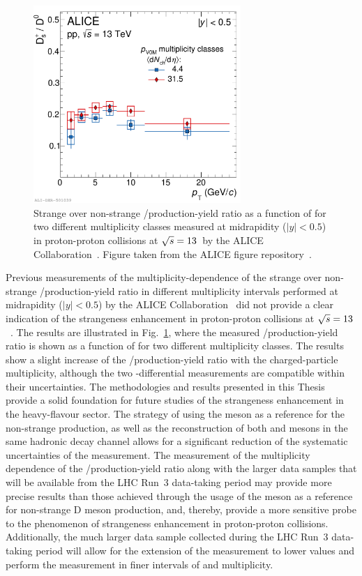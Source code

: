 \begin{figure}[tb]
    \centering
    \includegraphics[width=0.7\textwidth]{Figures/Chapter 9/DsD0Ratios_LowHighMult_V0M_Derived.pdf}
    \caption{Strange over non-strange \ds/\dz production-yield ratio as a function of \pt for two different multiplicity classes measured at midrapidity ($\lvert y\rvert<0.5$) in proton-proton collisions at $\sqrt{s}=13$~\tev by the ALICE Collaboration~\cite{ALICE:2021npz}. Figure taken from the ALICE figure repository~\cite{ALICE_figures}.}
    \label{fig:ALICE_DsD0VsMultiplicity}
\end{figure}

Previous measurements of the multiplicity-dependence of the strange over non-strange \ds/\dz production-yield ratio in different multiplicity intervals performed at midrapidity ($\lvert y\rvert<0.5$) by the ALICE Collaboration~\cite{ALICE:2021npz} did not provide a clear indication of the strangeness enhancement in proton-proton collisions at $\sqrt{s}=13$~\tev. The results are illustrated in Fig.~\ref{fig:ALICE_DsD0VsMultiplicity}, where the measured \ds/\dz production-yield ratio is shown as a function of \pt for two different multiplicity classes. The results show a slight increase of the \ds/\dz production-yield ratio with the charged-particle multiplicity, although the two \pt-differential measurements are compatible within their uncertainties. The methodologies and results presented in this Thesis provide a solid foundation for future studies of the strangeness enhancement in the heavy-flavour sector. The strategy of using the \dpl meson as a reference for the non-strange production, as well as the reconstruction of both \ds and \dpl mesons in the same hadronic decay channel allows for a significant reduction of the systematic uncertainties of the measurement. The measurement of the multiplicity dependence of the \ds/\dpl production-yield ratio along with the larger data samples that will be available from the LHC Run~3 data-taking period may provide more precise results than those achieved through the usage of the \dz meson as a reference for non-strange D meson production, and, thereby, provide a more sensitive probe to the phenomenon of strangeness enhancement in proton-proton collisions. Additionally, the much larger data sample collected during the LHC Run~3 data-taking period will allow for the extension of the measurement to lower \pt values and perform the measurement in finer intervals of \pt and multiplicity.

